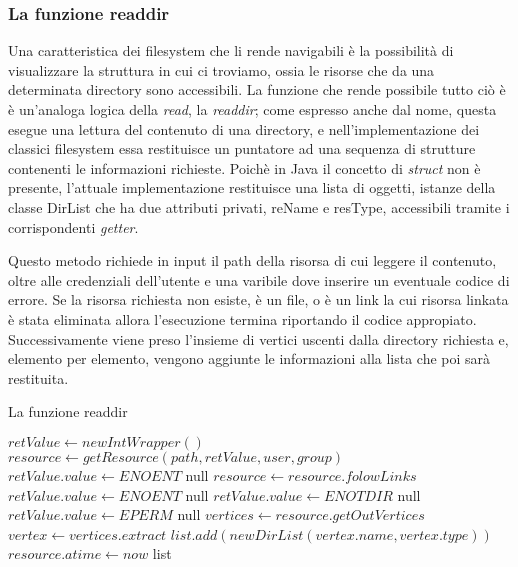 \newpage

\subsubsection{La funzione readdir}
Una caratteristica dei filesystem che li rende navigabili è la possibilità di visualizzare la struttura in cui ci troviamo, ossia le risorse che da una determinata directory sono accessibili. La funzione che rende possibile tutto ciò è è un'analoga logica della \emph{read}, la \emph{readdir}; come espresso anche dal nome, questa esegue una lettura del contenuto di una directory, e nell'implementazione dei classici filesystem essa restituisce un puntatore ad una sequenza di strutture contenenti le informazioni richieste. Poichè in Java il concetto di \emph{struct} non è presente, l'attuale implementazione restituisce una lista di oggetti, istanze della classe DirList che ha due attributi privati, reName e resType, accessibili tramite i corrispondenti \emph{getter}. 

Questo metodo richiede in input il path della risorsa di cui leggere il contenuto, oltre alle credenziali dell'utente e una varibile dove inserire un eventuale codice di errore. Se la risorsa richiesta non esiste, è un file, o è un link la cui risorsa linkata è stata eliminata allora l'esecuzione termina riportando il codice appropiato. Successivamente viene preso l'insieme di vertici uscenti dalla directory richiesta e, elemento per elemento, vengono aggiunte le informazioni alla lista che poi sarà restituita.

\begin{algorithm}
\begin{algorithmic}[5]
\caption{La funzione readdir}
	\State $retValue \gets new IntWrapper()$
	\State $resource \gets getResource(path, retValue, user, group)$
		\State $retValue.value \gets ENOENT$
		\State \Return null
	\EndIf
		\State $resource \gets resource.folowLinks$
	\EndIf
		\State $retValue.value \gets ENOENT$
		\State \Return null
		\State $retValue.value \gets ENOTDIR$
		\State \Return null
	\EndIf
		\State $retValue.value \gets EPERM$
		\State \Return null
	\EndIf
	\State $vertices \gets resource.getOutVertices$
		\State $vertex \gets vertices.extract$
		\State $list.add(new DirList(vertex.name, vertex.type))$
	\EndWhile
	\State $resource.atime \gets now$
	\State \Return list
\EndFunction
\end{algorithmic}
\end{algorithm}

